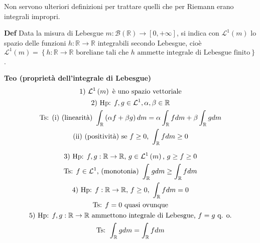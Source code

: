\documentclass{article}
\begin{document}
Non servono ulteriori definizioni per trattare quelli che per Riemann erano
integrali impropri.

\textbf{Def} Data la misura di Lebesgue $m:\mathcal{B}\left( 
\mathbb{R}
\right) \rightarrow \left[ 0,+\infty \right] $, si indica con $\mathcal{L}%
^{1}\left( m\right) $ lo spazio delle funzioni $h:%
\mathbb{R}
\rightarrow 
\mathbb{R}
$ integrabili secondo Lebesgue, cio\`{e} $\mathcal{L}^{1}\left( m\right)
=\left\{ h:%
\mathbb{R}
\rightarrow 
\mathbb{R}
\text{ boreliane tali che }h\text{ ammette integrale di Lebesgue finito}%
\right\} $.

\textbf{Teo (propriet\`{a} dell'integrale di Lebesgue)} 
\begin{gather*}
\text{1) }\mathcal{L}^{1}\left( m\right) \text{ \`{e} uno spazio vettoriale}
\\
\text{2) Hp: }f,g\in \mathcal{L}^{1},\alpha ,\beta \in 
\mathbb{R}
\\
\text{Ts: (i) (linearit\`{a}) }\int_{%
\mathbb{R}
}\left( \alpha f+\beta g\right) dm=\alpha \int_{%
\mathbb{R}
}fdm+\beta \int_{%
\mathbb{R}
}gdm \\
\text{(ii) (positivit\`{a}) se }f\geq 0\text{, }\int_{%
\mathbb{R}
}fdm\geq 0
\end{gather*}

\begin{gather*}
\text{3) Hp: }f,g:%
\mathbb{R}
\rightarrow 
\mathbb{R}
\text{, }g\in \mathcal{L}^{1}\left( m\right) \text{, }g\geq f\geq 0 \\
\text{Ts: }f\in \mathcal{L}^{1}\text{, (monotonia) }\int_{%
\mathbb{R}
}gdm\geq \int_{%
\mathbb{R}
}fdm \\
\text{4) Hp: }f:%
\mathbb{R}
\rightarrow 
\mathbb{R}
\text{, }f\geq 0\text{, }\int_{%
\mathbb{R}
}fdm=0 \\
\text{Ts: }f=0\text{ quasi ovunque} \\
\text{5) Hp: }f,g:%
\mathbb{R}
\rightarrow 
\mathbb{R}
\text{ ammettono integrale di Lebesgue, }f=g\text{ q. o.} \\
\text{Ts: }\int_{%
\mathbb{R}
}gdm=\int_{%
\mathbb{R}
}fdm
\end{gather*}
\end{document}
